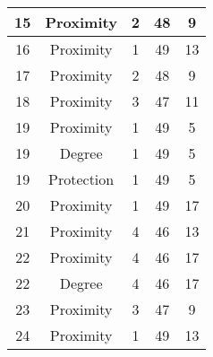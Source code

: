 \documentclass[results.tex]{subfiles}
\begin{document}
\begin{center}
\begin{tabular}{| c || c | c | c | c |}
            \hline
            15                      & Proximity                    & 2                      & 48                      & 9                    \\
            \hline
            16                      & Proximity                    & 1                      & 49                      & 13                   \\
            \hline
            17                      & Proximity                    & 2                      & 48                      & 9                    \\
            \hline
            18                      & Proximity                    & 3                      & 47                      & 11                   \\
            \hline
            19                      & Proximity                    & 1                      & 49                      & 5                    \\
            \hline
            19                      & Degree                       & 1                      & 49                      & 5                    \\
            \hline
            19                      & Protection                   & 1                      & 49                      & 5                    \\
            \hline
            20                      & Proximity                    & 1                      & 49                      & 17                   \\
            \hline
            21                      & Proximity                    & 4                      & 46                      & 13                   \\
            \hline
            22                      & Proximity                    & 4                      & 46                      & 17                   \\
            \hline
            22                      & Degree                       & 4                      & 46                      & 17                   \\
            \hline
            23                      & Proximity                    & 3                      & 47                      & 9                    \\
            \hline
            24                      & Proximity                    & 1                      & 49                      & 13                   \\

\end{tabular}
\end{center}
\end{document}
